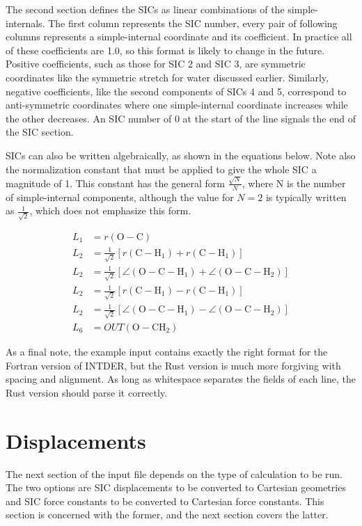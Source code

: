\documentclass{article}
\begin{document}
The second section defines the SICs as linear combinations of the
simple-internals. The first column represents the SIC number, every pair of
following columns represents a simple-internal coordinate and its coefficient.
In practice all of these coefficients are 1.0, so this format is likely to
change in the future. Positive coefficients, such as those for SIC 2 and SIC 3,
are symmetric coordinates like the symmetric stretch for water discussed
earlier. Similarly, negative coefficients, like the second components of SICs 4
and 5, correspond to anti-symmetric coordinates where one simple-internal
coordinate increases while the other decreases. An SIC number of 0 at the start
of the line signals the end of the SIC section.

SICs can also be written algebraically, as shown in the equations below. Note
also the normalization constant that must be applied to give the whole SIC a
magnitude of 1. This constant has the general form $\frac{\sqrt{N}}{N}$, where N
is the number of simple-internal components, although the value for $N=2$ is
typically written as $\frac{1}{\sqrt{2}}$, which does not emphasize this form.

\begin{align}
  L_1 &= r(\text{O}-\text{C}) \\
  L_2 &= \frac{1}{\sqrt{2}}[r(\text{C}-\text{H}_1) + r(\text{C}-\text{H}_1)]\\
  L_2 &= \frac{1}{\sqrt{2}}[\angle(\text{O}-\text{C}-\text{H}_1) + \angle(\text{O}-\text{C}-\text{H}_2)]\\
  L_2 &= \frac{1}{\sqrt{2}}[r(\text{C}-\text{H}_1) - r(\text{C}-\text{H}_1)]\\
  L_2 &= \frac{1}{\sqrt{2}}[\angle(\text{O}-\text{C}-\text{H}_1) - \angle(\text{O}-\text{C}-\text{H}_2)]\\
  L_6 &= OUT(\text{O}-\text{CH}_2)
\end{align}

As a final note, the example input contains exactly the right format for the
Fortran version of INTDER, but the Rust version is much more forgiving with
spacing and alignment. As long as whitespace separates the fields of each line,
the Rust version should parse it correctly.

\section{Displacements}
\label{sec:disp}

The next section of the input file depends on the type of calculation to be run.
The two options are SIC displacements to be converted to Cartesian geometries
and SIC force constants to be converted to Cartesian force constants. This
section is concerned with the former, and the next section covers the latter.
\end{document}
